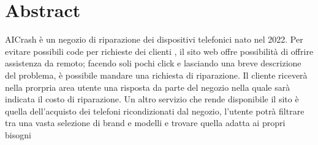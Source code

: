 \section*{Abstract}

AICrash è un negozio di riparazione dei dispositivi telefonici nato nel 2022. Per evitare
possibili code per richieste dei clienti , il sito web offre possibilità di offrire assistenza da remoto;
facendo soli pochi click e lasciando una breve descrizione del problema, è possibile mandare una richiesta 
di riparazione. Il cliente riceverà nella prorpria area utente una risposta da parte del negozio nella quale
sarà indicata il costo di riparazione.
Un altro servizio che rende disponibile il sito è quella dell'acquisto dei telefoni ricondizionati
dal negozio, l'utente potrà filtrare tra una vasta selezione di brand e modelli e trovare
quella adatta ai propri bisogni
